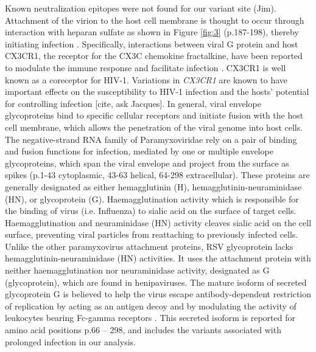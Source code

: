 \documentclass{article} %
\begin{document}
Known neutralization epitopes were not found for our variant site (Jim).
Attachment of the virion to the host cell membrane is thought to occur through interaction with heparan sulfate as shown in Figure \ref{fig:3}
(p.187-198), thereby initiating infection 
\cite{levine1987demonstration, feldman1999identification, feldman2000fusion}.
Specifically, interactions between viral G protein and host CX3CR1, the receptor for the CX3C chemokine fractalkine, have been reported to modulate the immune response and facilitate infection 
\cite{johnson2015respiratory, tripp2001cx3c, jeong2015cx3cr1}.
CX3CR1 is well known as a coreceptor for HIV-1. 
Variations in \textit{CX3CR1} are known to have important effects on the susceptibility to HIV-1 infection and the hosts' potential for controlling infection [cite, ask Jacques].
In general, viral envelope glycoproteins bind to specific cellular receptors and initiate fusion with the host cell membrane, 
which allows the penetration of the viral genome into host cells. 
The negative-strand RNA family of Paramyxoviridae rely on a pair of binding and fusion functions for infection, mediated by one or multiple envelope glycoproteins,
which span the viral envelope and project from the surface as spikes 
(p.1-43 cytoplasmic, 43-63 helical, 64-298 extracellular).
These proteins are generally designated as either hemagglutinin (H), hemagglutinin-neuraminidase (HN), or glycoprotein (G). 
Haemagglutination activity which is responsible for the binding of virus (i.e. Influenza) to sialic acid on the surface of target cells.
Haemagglutination and neuraminidase (HN) activity cleaves sialic acid on the cell surface, preventing viral particles from reattaching to previously infected cells. 
Unlike the other paramyxovirus attachment proteins, 
RSV glycoprotein lacks hemagglutinin-neuraminidase (HN) activities.
It uses the attachment protein with neither haemagglutination nor neuraminidase activity, designated as G (glycoprotein), which are found in henipaviruses.
\cite{takimoto2002role, malvoisin1993measles, hu1992functional, horvath1992biological, bousse1994regions}
The mature isoform of secreted glycoprotein G is believed to help the virus escape antibody-dependent restriction of replication by acting as an antigen decoy and by modulating the activity of leukocytes bearing Fc-gamma receptors 
\cite{bukreyev2008secreted}.
This secreted isoform is reported for amino acid positions p.66 – 298, and includes the variants associated with prolonged infection in our analysis. 
\end{document}
